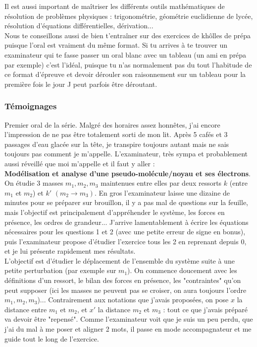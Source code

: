 Il est aussi important de maîtriser les différents outils mathématiques de résolution de problèmes physiques : trigonométrie, géométrie euclidienne de lycée, résolution d’équations différentielles, dérivation...\\

Nous te conseillons aussi de bien t'entraîner sur des exercices de khôlles de prépa puisque l’oral est vraiment du même format. Si tu arrives à te trouver un examinateur qui te fasse passer un oral blanc avec un tableau (un ami en prépa par exemple) c’est l’idéal, puisque tu n’as normalement pas du tout l’habitude de ce format d’épreuve et devoir dérouler son raisonnement sur un tableau pour la première fois le jour J peut parfois être déroutant.

\subsubsection{Témoignages}

\lettrine{{\color{violet} \oldpilcrowfive}}{}
Premier oral de la série. Malgré des horaires assez honnêtes, j'ai encore l'impression de ne pas être totalement sorti de mon lit. Après 5 cafés et 3 passages d'eau glacée sur la tête, je transpire toujours autant mais ne sais toujours pas comment je m'appelle. L'examinateur, très sympa et probablement aussi réveillé que moi m'appelle et il faut y aller : \\

\textbf{Modélisation et analyse d'une pseudo-molécule/noyau et ses électrons}. On étudie 3 masses $m_1, m_2, m_3$ maintenues entre elles par deux ressorts $k$ (entre $m_1$ et $m_2$) et $k'$ $(m_2 \rightarrow m_3)$. En gros l'examinateur laisse une dizaine de minutes pour se préparer sur brouillon, il y a pas mal de questions sur la feuille, mais l'objectif est principalement d'appréhender le système, les forces en présence, les ordres de grandeur... J'arrive lamentablement à écrire les équations nécessaires pour les questions 1 et 2 (avec une petite erreur de signe en bonus), puis l'examinateur propose d'étudier l'exercice tous les 2 en reprenant depuis 0, et je lui présente rapidement mes résultats.\\

L'objectif est d'étudier le déplacement de l'ensemble du système suite à une petite perturbation (par exemple sur $m_1$). On commence doucement avec les définitions d'un ressort, le bilan des forces en présence, les "contraintes" qu'on peut supposer (ici les masses ne peuvent pas se croiser, on aura toujours l'ordre $m_1, m_2, m_3$)... Contrairement aux notations que j'avais proposées, on pose $x$ la distance entre $m_1$ et $m_2$, et $x'$ la distance $m_2$ et $m_3$ : tout ce que j'avais préparé va devoir être "repensé". Comme l'examinateur voit que je suis un peu perdu, que j'ai du mal à me poser et aligner 2 mots, il passe en mode accompagnateur et me guide tout le long de l'exercice.\\

